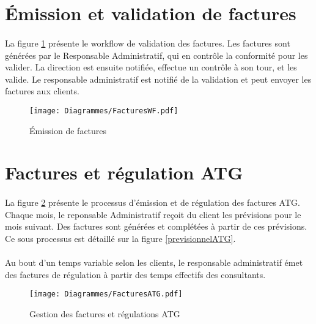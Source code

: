 \section{Émission et validation de factures}

\paragraph{} La figure \ref{validationFactures} présente le workflow de validation des factures. Les factures sont générées par le Responsable Administratif, qui en contrôle la conformité pour les valider. La direction est ensuite notifiée, effectue un contrôle à son tour, et les valide. Le responsable administratif est notifié de la validation et peut envoyer les factures aux clients.


	
\begin{figure}
	\centering
	\begin{sideways}
		\texttt{[image: Diagrammes/FacturesWF.pdf]}
	\end{sideways}
	\caption{Émission de factures}
	\label{validationFactures}	
\end{figure}

\section{Factures et régulation ATG}
\paragraph{} La figure \ref{facturesATG} présente le processus d'émission et de régulation des factures ATG. Chaque mois, le reponsable Administratif reçoit du client les prévisions pour le mois suivant. Des factures sont générées et complétées à partir de ces prévisions. Ce sous processus est détaillé sur la figure \ref{previsionnelATG}.
\paragraph{} Au bout d'un temps variable selon les clients, le responsable administratif émet des factures de régulation à partir des temps effectifs des consultants.   

\begin{figure}
	\centering
		\texttt{[image: Diagrammes/FacturesATG.pdf]}
	\caption{Gestion des factures et régulations ATG}
	\label{facturesATG}	
\end{figure}	


